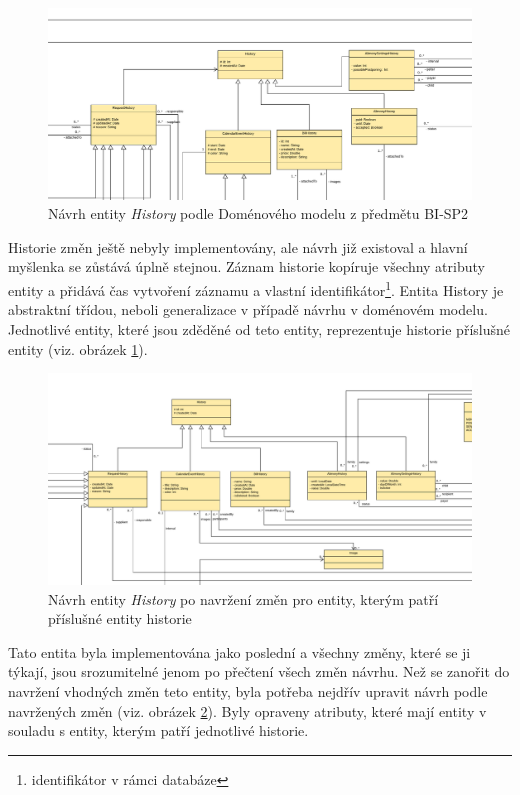         \begin{figure}\centering
	        \includegraphics[width=1.0\textwidth]{pdfs/History1}
	        \caption[Návrh entity History]{Návrh entity \textit{History} podle Doménového modelu z předmětu BI-SP2}\label{image:History1}
        \end{figure}
        Historie změn ještě nebyly implementovány, ale návrh již existoval a hlavní myšlenka se zůstává úplně stejnou. Záznam historie kopíruje všechny atributy entity a přidává čas vytvoření záznamu a vlastní identifikátor\footnote{identifikátor v rámci databáze}. Entita History je abstraktní třídou, neboli generalizace v případě návrhu v doménovém modelu. Jednotlivé entity, které jsou zděděné od teto entity, reprezentuje historie příslušné entity (viz. obrázek \ref{image:History1}). 
    
        \begin{figure}\centering
	        \includegraphics[width=1.0\textwidth]{pdfs/History1_2}
	        \caption[Návrh entity History po změnách návrhu]{Návrh entity \textit{History} po navržení změn pro entity, kterým patří příslušné entity historie}\label{image:History1_2}
        \end{figure}
        Tato entita byla implementována jako poslední a všechny změny, které se ji týkají, jsou srozumitelné jenom po přečtení všech změn návrhu. Než se zanořit do navržení vhodných změn teto entity, byla potřeba nejdřív upravit návrh podle navržených změn (viz. obrázek \ref{image:History1_2}). Byly opraveny atributy, které mají entity v souladu s entity, kterým patří jednotlivé historie.
        

